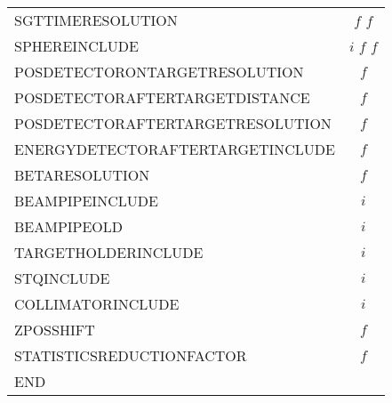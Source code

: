 \documentclass[12pt]{book}
\begin{document}
\begin{table}[ht]
\begin{tabular}{|l||c|}
    SGTTIMERESOLUTION                & $f$ $f$         \\
    SPHEREINCLUDE                    & $i$ $f$ $f$     \\
    POSDETECTORONTARGETRESOLUTION    & $f$             \\
    POSDETECTORAFTERTARGETDISTANCE   & $f$             \\
    POSDETECTORAFTERTARGETRESOLUTION & $f$             \\
    ENERGYDETECTORAFTERTARGETINCLUDE & $f$             \\
    BETARESOLUTION                   & $f$             \\
    BEAMPIPEINCLUDE                  & $i$             \\
    BEAMPIPEOLD				& $i$		\\
    TARGETHOLDERINCLUDE              & $i$             \\
    STQINCLUDE                       & $i$             \\
    COLLIMATORINCLUDE                & $i$             \\
    ZPOSSHIFT				& $f$		\\
    STATISTICSREDUCTIONFACTOR        & $f$             \\
    END                              &                 \\
    
    \hline
  \end{tabular}
\end{table}

\FloatBarrier
\end{document}
